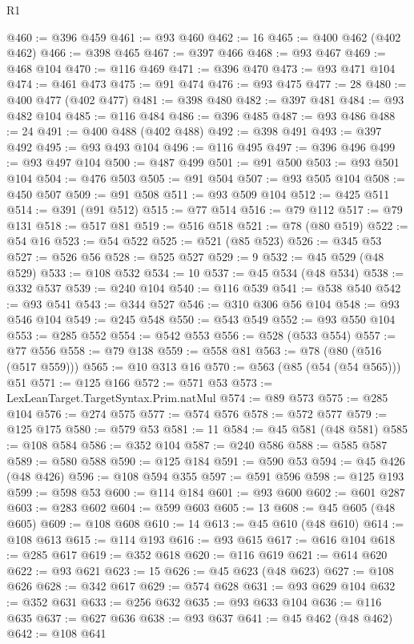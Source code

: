 \begin{lexlean}{R1}
\begin{coremodule}
@460 := @396 @459
@461 := @93 @460
@462 := 16
@465 := @400 @462 (@402 @462)
@466 := @398 @465
@467 := @397 @466
@468 := @93 @467
@469 := @468 @104
@470 := @116 @469
@471 := @396 @470
@473 := @93 @471 @104
@474 := @461 @473
@475 := @91 @474
@476 := @93 @475
@477 := 28
@480 := @400 @477 (@402 @477)
@481 := @398 @480
@482 := @397 @481
@484 := @93 @482 @104
@485 := @116 @484
@486 := @396 @485
@487 := @93 @486
@488 := 24
@491 := @400 @488 (@402 @488)
@492 := @398 @491
@493 := @397 @492
@495 := @93 @493 @104
@496 := @116 @495
@497 := @396 @496
@499 := @93 @497 @104
@500 := @487 @499
@501 := @91 @500
@503 := @93 @501 @104
@504 := @476 @503
@505 := @91 @504
@507 := @93 @505 @104
@508 := @450 @507
@509 := @91 @508
@511 := @93 @509 @104
@512 := @425 @511
@514 := @391 (@91 @512)
@515 := @77 @514
@516 := @79 @112
@517 := @79 @131
@518 := @517 @81
@519 := @516 @518
@521 := @78 (@80 @519)
@522 := @54 @16
@523 := @54 @522
@525 := @521 (@85 @523)
@526 := @345 @53
@527 := @526 @56
@528 := @525 @527
@529 := 9
@532 := @45 @529 (@48 @529)
@533 := @108 @532
@534 := 10
@537 := @45 @534 (@48 @534)
@538 := @332 @537
@539 := @240 @104
@540 := @116 @539
@541 := @538 @540
@542 := @93 @541
@543 := @344 @527
@546 := @310 @306 @56 @104
@548 := @93 @546 @104
@549 := @245 @548
@550 := @543 @549
@552 := @93 @550 @104
@553 := @285 @552
@554 := @542 @553
@556 := @528 (@533 @554)
@557 := @77 @556
@558 := @79 @138
@559 := @558 @81
@563 := @78 (@80 (@516 (@517 @559)))
@565 := @10 @313 @16
@570 := @563 (@85 (@54 (@54 @565))) @51
@571 := @125 @166
@572 := @571 @53
@573 := LexLeanTarget.TargetSyntax.Prim.natMul
@574 := @89 @573
@575 := @285 @104
@576 := @274 @575
@577 := @574 @576
@578 := @572 @577
@579 := @125 @175
@580 := @579 @53
@581 := 11
@584 := @45 @581 (@48 @581)
@585 := @108 @584
@586 := @352 @104
@587 := @240 @586
@588 := @585 @587
@589 := @580 @588
@590 := @125 @184
@591 := @590 @53
@594 := @45 @426 (@48 @426)
@596 := @108 @594 @355
@597 := @591 @596
@598 := @125 @193
@599 := @598 @53
@600 := @114 @184
@601 := @93 @600
@602 := @601 @287
@603 := @283 @602
@604 := @599 @603
@605 := 13
@608 := @45 @605 (@48 @605)
@609 := @108 @608
@610 := 14
@613 := @45 @610 (@48 @610)
@614 := @108 @613
@615 := @114 @193
@616 := @93 @615
@617 := @616 @104
@618 := @285 @617
@619 := @352 @618
@620 := @116 @619
@621 := @614 @620
@622 := @93 @621
@623 := 15
@626 := @45 @623 (@48 @623)
@627 := @108 @626
@628 := @342 @617
@629 := @574 @628
@631 := @93 @629 @104
@632 := @352 @631
@633 := @256 @632
@635 := @93 @633 @104
@636 := @116 @635
@637 := @627 @636
@638 := @93 @637
@641 := @45 @462 (@48 @462)
@642 := @108 @641

\end{coremodule}
\end{lexlean}
